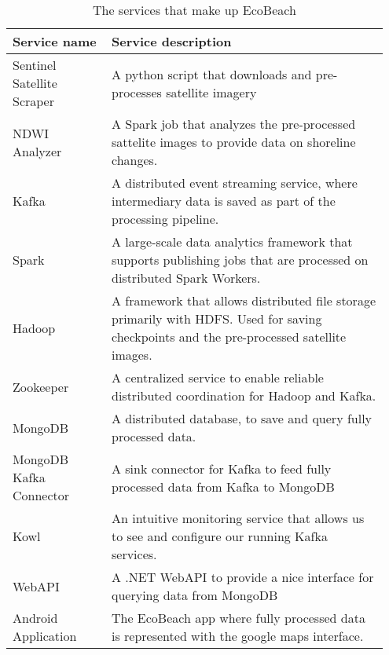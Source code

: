 \begin{table}[]
    \centering
    \begin{tabular}{| p{0.25\linewidth} | p{0.7\linewidth} |}
        \hline
        \textbf{Service name}      & \textbf{Service description}                                                                                                              \\ \hline
        Sentinel Satellite Scraper & A python script that downloads and pre-processes satellite imagery                                                                        \\\hline
        NDWI Analyzer              & A Spark job that analyzes the pre-processed sattelite images to provide data on shoreline changes.                                        \\\hline
        Kafka                      & A distributed event streaming service, where intermediary data is saved as part of the processing pipeline.                               \\\hline
        Spark                      & A large-scale data analytics framework that supports publishing jobs that are processed on distributed Spark Workers.                     \\\hline
        Hadoop                     & A framework that allows distributed file storage primarily with HDFS. Used for saving checkpoints and the pre-processed satellite images. \\\hline
        Zookeeper                  & A centralized service to enable reliable distributed coordination for Hadoop and Kafka.                                                   \\\hline
        MongoDB                    & A distributed database, to save and query fully processed data.                                                                           \\\hline
        MongoDB Kafka Connector    & A sink connector for Kafka to feed fully processed data from Kafka to MongoDB                                                             \\\hline
        Kowl                       & An intuitive monitoring service that allows us to see and configure our running Kafka services.                                           \\\hline
        WebAPI                     & A .NET WebAPI to provide a nice interface for querying data from MongoDB                                                                  \\\hline
        Android Application        & The EcoBeach app where fully processed data is represented with the google maps interface.                                                \\\hline
    \end{tabular}
    \caption{The services that make up EcoBeach}
    \label{tab:ecobeach-services}
\end{table}

